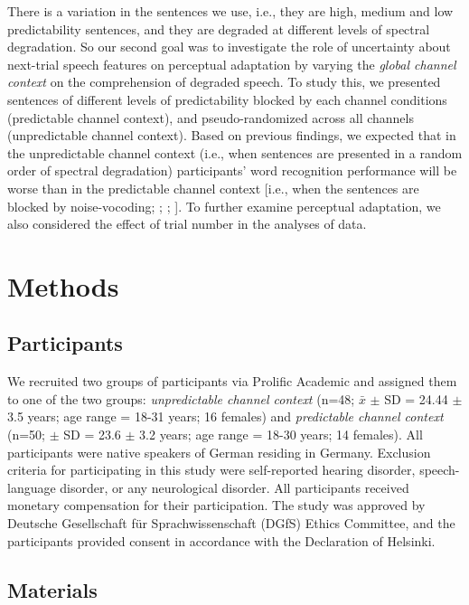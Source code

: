 \documentclass[a4paper, nobind]{templates/ociamthesis}
\begin{document}
There is a variation in the sentences we use, i.e., they are high, medium and low predictability sentences, and they are degraded at different levels of spectral degradation.
So our second goal was to investigate the role of uncertainty about next-trial speech features on perceptual adaptation by varying the \emph{global channel context} on the comprehension of degraded speech.
To study this, we presented sentences of different levels of predictability blocked by each channel conditions (predictable channel context), and pseudo-randomized across all channels (unpredictable channel context).
Based on previous findings, we expected that in the unpredictable channel context (i.e., when sentences are presented in a random order of spectral degradation) participants' word recognition performance will be worse than in the predictable channel context {[}i.e., when the sentences are blocked by noise-vocoding; \textcite{Sommers1994}; \textcite{Garrido2011}; \textcite{Vaden2013}{]}.
To further examine perceptual adaptation, we also considered the effect of trial number in the analyses of data.

\hypertarget{methods-2}{%
\section{Methods}\label{methods-2}}

\hypertarget{participants-1}{%
\subsection{Participants}\label{participants-1}}

We recruited two groups of participants via Prolific Academic and assigned them to one of the two groups:
\emph{unpredictable channel context} (n=48; \(\bar{x}\) \(\pm\) SD = 24.44 \(\pm\) 3.5 years; age range = 18-31 years; 16 females) and \emph{predictable channel context} (n=50; \(\pm\) SD = 23.6 \(\pm\) 3.2 years; age range = 18-30 years; 14 females).
All participants were native speakers of German residing in Germany.
Exclusion criteria for participating in this study were self-reported hearing disorder, speech-language disorder, or any neurological disorder.
All participants received monetary compensation for their participation.
The study was approved by Deutsche Gesellschaft für Sprachwissenschaft (DGfS) Ethics Committee, and the participants provided consent in accordance with the Declaration of Helsinki.

\hypertarget{materials}{%
\subsection{Materials}\label{materials}}
\end{document}
